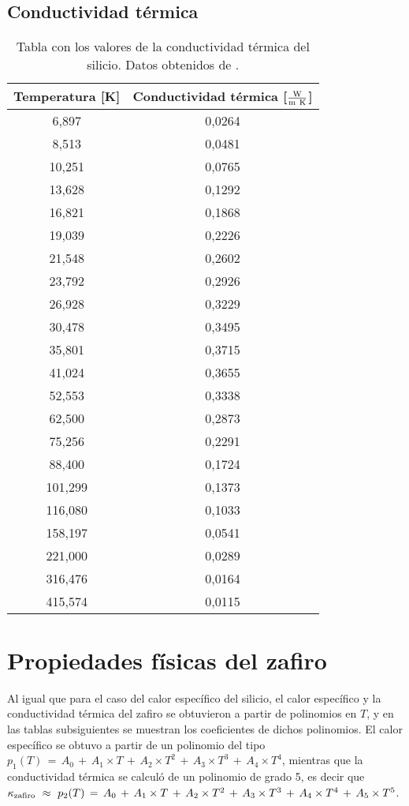 \subsection*{Conductividad térmica}
\begin{table}[h!]
  \centering
  \begin{tabular}{|c|c|}\hline
	Temperatura [K]	&	Conductividad térmica [$\frac{\rm W}{\rm m\ K}$]	\\ \hline
	6,897	&	0,0264	\\
	8,513	&	0,0481	\\
	10,251	&	0,0765	\\
	13,628	&	0,1292	\\
	16,821	&	0,1868	\\
	19,039	&	0,2226	\\
	21,548	&	0,2602	\\
	23,792	&	0,2926	\\
	26,928	&	0,3229	\\
	30,478	&	0,3495	\\
	35,801	&	0,3715	\\
	41,024	&	0,3655	\\
	52,553	&	0,3338	\\
	62,500	&	0,2873	\\
	75,256	&	0,2291	\\
	88,400	&	0,1724	\\
	101,299	&	0,1373	\\
	116,080	&	0,1033	\\
	158,197	&	0,0541	\\
	221,000	&	0,0289	\\
	316,476	&	0,0164	\\
	415,574	&	0,0115	\\ \hline
  \end{tabular}
  \caption[Tabla con los valores de la conductividad térmica del silicio.]{Tabla con los valores de la conductividad térmica del silicio. Datos obtenidos de \cite{Glassbrenner1964}.}
  \label{tab:ksi}
\end{table}
\newpage
\section{Propiedades físicas del zafiro}
Al igual que para el caso del calor específico del silicio, el calor específico y la  conductividad térmica del zafiro se obtuvieron a partir de polinomios en $T$, y en las tablas subsiguientes se muestran los coeficientes de dichos polinomios. El calor específico se obtuvo a partir de un polinomio del tipo $p_1(T) \,=\, A_0\,+\,A_1 \times T\,+\,A_2 \times T^2\,+\,A_3 \times T^3\,+\,A_4 \times T^4$, mientras que la conductividad térmica se calculó de un polinomio de grado 5, es decir que $\kappa_{\rm zafiro} \ \approx \ p_2(T) \,=\, A_0\,+\,A_1 \times T\,+\,A_2 \times T^2\,+\,A_3 \times T^3\,+\,A_4 \times T^4\,+\,A_5 \times T^5$.
